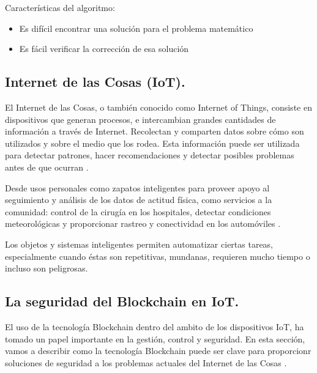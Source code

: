 \vspace{5mm}

\noindent Características del algoritmo: 

\begin{itemize}
    \item Es difícil encontrar una solución para el problema matemático
    \item Es fácil verificar la corrección de esa solución
\end{itemize}

\subsection{Internet de las Cosas (IoT).}

El Internet de las Cosas, o también conocido como Internet of Things, consiste en dispositivos que generan procesos, e 
intercambian grandes cantidades de información a través de Internet. Recolectan y comparten datos sobre cómo son 
utilizados y sobre el medio que los rodea. Esta información puede ser utilizada para detectar patrones, hacer 
recomendaciones y detectar posibles problemas antes de que ocurran \cite{what-is-iot, novo2018blockchain}.

\vspace{5mm}

\noindent Desde usos personales como zapatos inteligentes para proveer apoyo al seguimiento y análisis de los datos de 
actitud física, como servicios a la comunidad: control de la cirugía en los hospitales, detectar condiciones 
meteorológicas y proporcionar rastreo y conectividad en los automóviles \cite{khan2018iot}.

\vspace{5mm}

\noindent  Los objetos y sistemas inteligentes permiten automatizar ciertas tareas, especialmente cuando éstas son 
repetitivas, mundanas, requieren mucho tiempo o incluso son peligrosas.

\subsection{La seguridad del Blockchain en IoT.}

El uso de la tecnología Blockchain dentro del ambito de los dispositivos IoT, ha tomado un papel importante en la 
gestión, control y seguridad. En esta sección, vamos a describir como la tecnología Blockchain puede ser clave para
proporcionr soluciones de seguridad a los problemas actuales del Internet de las Cosas 
\cite{khan2018iot, reyna2018blockchain}.

